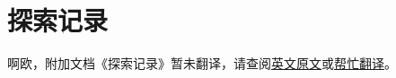 \renewcommand{\DOCNAME}{探索记录}
\renewcommand{\DOCSLUG}{026-exploration-logs}

\section{\DOCNAME}

\label{sec:DOC-\DOCSLUG}

啊欧，附加文档《\DOCNAME 》暂未翻译，请查阅\href{http://scp-wiki.wikidot.com/\DOCSLUG}{英文原文}或\href{http://scp-wiki-cn.wikidot.com/\DOCSLUG}{帮忙翻译}。

